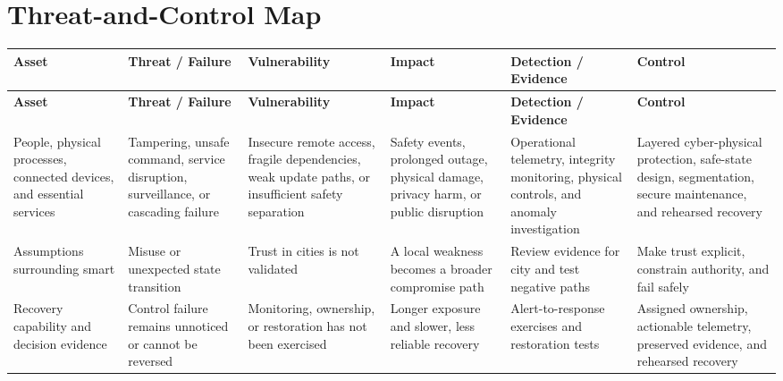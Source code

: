 \documentclass[11pt,letterpaper]{article}
\begin{document}
\section*{Threat-and-Control Map}
\begingroup\scriptsize\setlength{\tabcolsep}{2pt}
\begin{longtable}{>{\raggedright\arraybackslash}p{}>{\raggedright\arraybackslash}p{}>{\raggedright\arraybackslash}p{}>{\raggedright\arraybackslash}p{}>{\raggedright\arraybackslash}p{}>{\raggedright\arraybackslash}p{}}
\toprule\rowcolor{Navy}\color{white}\textbf{Asset} & \color{white}\textbf{Threat / Failure} & \color{white}\textbf{Vulnerability} & \color{white}\textbf{Impact} & \color{white}\textbf{Detection / Evidence} & \color{white}\textbf{Control}\\\midrule
\endfirsthead
\toprule\rowcolor{Navy}\color{white}\textbf{Asset} & \color{white}\textbf{Threat / Failure} & \color{white}\textbf{Vulnerability} & \color{white}\textbf{Impact} & \color{white}\textbf{Detection / Evidence} & \color{white}\textbf{Control}\\\midrule
\endhead
People, physical processes, connected devices, and essential services & Tampering, unsafe command, service disruption, surveillance, or cascading failure & Insecure remote access, fragile dependencies, weak update paths, or insufficient safety separation & Safety events, prolonged outage, physical damage, privacy harm, or public disruption & Operational telemetry, integrity monitoring, physical controls, and anomaly investigation & Layered cyber-physical protection, safe-state design, segmentation, secure maintenance, and rehearsed recovery\\\midrule
Assumptions surrounding smart & Misuse or unexpected state transition & Trust in cities is not validated & A local weakness becomes a broader compromise path & Review evidence for city and test negative paths & Make trust explicit, constrain authority, and fail safely\\\midrule
Recovery capability and decision evidence & Control failure remains unnoticed or cannot be reversed & Monitoring, ownership, or restoration has not been exercised & Longer exposure and slower, less reliable recovery & Alert-to-response exercises and restoration tests & Assigned ownership, actionable telemetry, preserved evidence, and rehearsed recovery\\\midrule
\bottomrule
\end{longtable}
\endgroup
\end{document}
